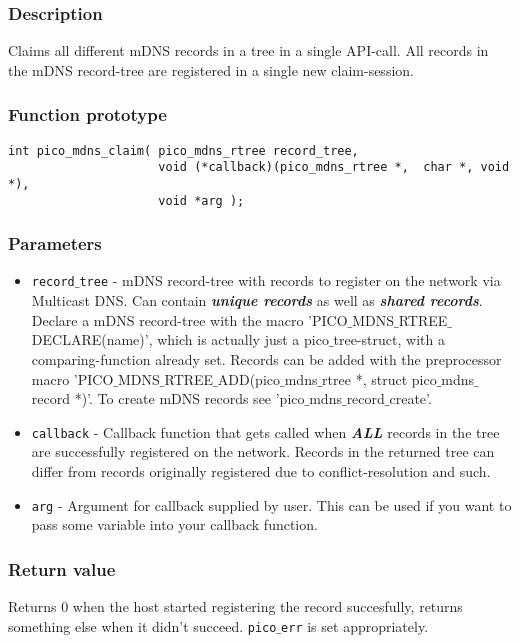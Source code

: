 \subsubsection*{Description}
Claims all different mDNS records in a tree in a single API-call. All records in the mDNS record-tree are registered in a single new claim-session.

\subsubsection*{Function prototype}
\begin{verbatim}
int pico_mdns_claim( pico_mdns_rtree record_tree,
                     void (*callback)(pico_mdns_rtree *,  char *, void *),
                     void *arg );
\end{verbatim}

\subsubsection*{Parameters}
\begin{itemize}[noitemsep]
\item \texttt{record$\_$tree} - mDNS record-tree with records to register on the network via Multicast DNS. Can contain \textbf{\emph{unique records}} as well as \textbf{\emph{shared records}}. Declare a mDNS record-tree with the macro 'PICO$\_$MDNS$\_$RTREE$\_$DECLARE(name)', which is actually just a pico$\_$tree-struct, with a comparing-function already set. Records can be added with the preprocessor macro 'PICO$\_$MDNS$\_$RTREE$\_$ADD(pico$\_$mdns$\_$rtree *, struct pico$\_$mdns$\_$record *)'. To create mDNS records see 'pico$\_$mdns$\_$record$\_$create'.
\item \texttt{callback} - Callback function that gets called when \textbf{\emph{ALL}} records in the tree are successfully registered on the network. Records in the returned tree can differ from records originally registered due to conflict-resolution and such.
\item \texttt{arg} - Argument for callback supplied by user. This can be used if you want to pass some variable into your callback function.
\end{itemize}

\subsubsection*{Return value}
Returns 0 when the host started registering the record succesfully, returns something else when it didn't succeed. \texttt{pico$\_$err} is set appropriately.

